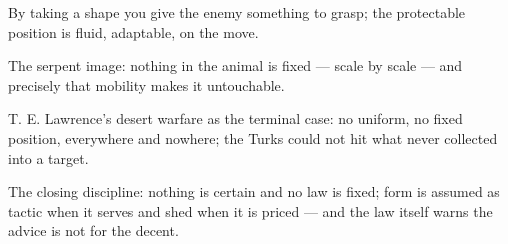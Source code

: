 

\begin{distilled}
  \item By taking a shape you give the enemy something to grasp; the protectable position is fluid, adaptable, on the move.
  \item The serpent image: nothing in the animal is fixed --- scale by scale --- and precisely that mobility makes it untouchable.
  \item T. E. Lawrence's desert warfare as the terminal case: no uniform, no fixed position, everywhere and nowhere; the Turks could not hit what never collected into a target.
  \item The closing discipline: nothing is certain and no law is fixed; form is assumed as tactic when it serves and shed when it is priced --- and the law itself warns the advice is not for the decent.
\end{distilled}
